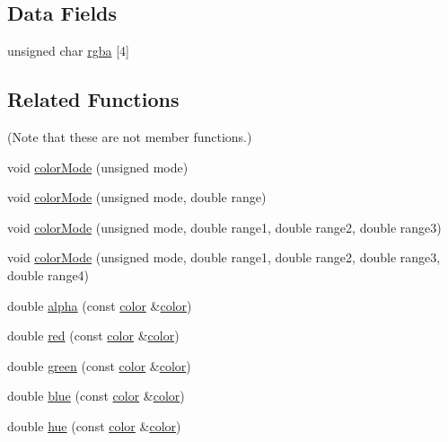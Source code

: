 \subsection*{\-Data \-Fields}
\begin{DoxyCompactItemize}
\item 
unsigned char \hyperlink{classcprocessing_1_1color_ad865cc84a545b713a1d09cd5f85f8e7e}{rgba} \mbox{[}4\mbox{]}
\end{DoxyCompactItemize}
\subsection*{\-Related \-Functions}
(\-Note that these are not member functions.) \begin{DoxyCompactItemize}
\item 
void \hyperlink{classcprocessing_1_1color_aef39a293a2b400a890797662dde3f756}{color\-Mode} (unsigned mode)
\item 
void \hyperlink{classcprocessing_1_1color_afec9a418b6eb9afe82a8ee393f0c18e4}{color\-Mode} (unsigned mode, double range)
\item 
void \hyperlink{classcprocessing_1_1color_a09b8b82d820ab12ac5e69fc776682069}{color\-Mode} (unsigned mode, double range1, double range2, double range3)
\item 
void \hyperlink{classcprocessing_1_1color_a90704ca9808897dedba2f18f8f41a434}{color\-Mode} (unsigned mode, double range1, double range2, double range3, double range4)
\item 
double \hyperlink{classcprocessing_1_1color_a4b8d104207883515b224550dd402db49}{alpha} (const \hyperlink{classcprocessing_1_1color}{color} \&\hyperlink{classcprocessing_1_1color}{color})
\item 
double \hyperlink{classcprocessing_1_1color_a7d4c1cd5bcdc8cc62ff513e10c0ae9eb}{red} (const \hyperlink{classcprocessing_1_1color}{color} \&\hyperlink{classcprocessing_1_1color}{color})
\item 
double \hyperlink{classcprocessing_1_1color_a359eeae13358f01e73db7aa5a40e1662}{green} (const \hyperlink{classcprocessing_1_1color}{color} \&\hyperlink{classcprocessing_1_1color}{color})
\item 
double \hyperlink{classcprocessing_1_1color_a153dd1d1c88660c50d913a179a511d7c}{blue} (const \hyperlink{classcprocessing_1_1color}{color} \&\hyperlink{classcprocessing_1_1color}{color})
\item 
double \hyperlink{classcprocessing_1_1color_a196199ed18da05cc6c5ceff3580dede8}{hue} (const \hyperlink{classcprocessing_1_1color}{color} \&\hyperlink{classcprocessing_1_1color}{color})

\end{DoxyCompactItemize}
